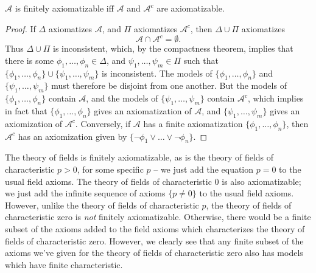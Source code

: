 \begin{theorem}
    $\mathcal{A}$ is finitely axiomatizable iff $\mathcal{A}$ and $\mathcal{A}^c$ are axiomatizable.
\end{theorem}
\begin{proof}
    If $\Delta$ axiomatizes $\mathcal{A}$, and $\Pi$ axiomatizes $\mathcal{A}^c$, then $\Delta \cup \Pi$ axiomatizes
    \[ \mathcal{A} \cap \mathcal{A}^c = \emptyset. \]
    Thus $\Delta \cup \Pi$ is inconsistent, which, by the compactness theorem, implies that there is some $\phi_1, \dots, \phi_n \in \Delta$, and $\psi_1, \dots, \psi_m \in \Pi$ such that $\{ \phi_1, \dots, \phi_n \} \cup \{ \psi_1, \dots, \psi_m \}$ is inconsistent. The models of $\{ \phi_1, \dots, \phi_n \}$ and $\{ \psi_1, \dots, \psi_m \}$ must therefore be disjoint from one another. But the models of $\{ \phi_1, \dots, \phi_n \}$ contain $\mathcal{A}$, and the models of $\{ \psi_1, \dots, \psi_m \}$ contain $\mathcal{A}^c$, which implies in fact that $\{ \phi_1, \dots, \phi_n \}$ gives an axiomatization of $\mathcal{A}$, and $\{ \psi_1,\dots,\psi_m \}$ gives an axiomization of $\mathcal{A}^c$. Conversely, if $\mathcal{A}$ has a finite axiomatization $\{ \phi_1, \dots, \phi_n \}$, then $\mathcal{A}^c$ has an axiomization given by $\{ \neg \phi_1 \vee \dots \vee \neg \phi_n \}$.
\end{proof}

\begin{example}
    The theory of fields is finitely axiomatizable, as is the theory of fields of characteristic $p > 0$, for some specific $p$ -- we just add the equation $p = 0$ to the usual field axioms. The theory of fields of characteristic $0$ is also axiomatizable; we just add the infinite sequence of axioms $\{ p \neq 0 \}$ to the usual field axioms. However, unlike the theory of fields of characteristic $p$, the theory of fields of characteristic zero is \emph{not} finitely axiomatizable. Otherwise, there would be a finite subset of the axioms added to the field axioms which characterizes the theory of fields of characteristic zero. However, we clearly see that any finite subset of the axioms we've given for the theory of fields of characteristic zero also has models which have finite characteristic.
\end{example}

